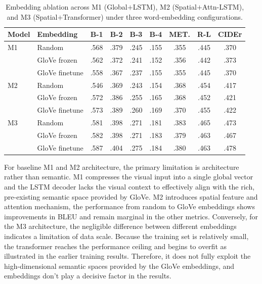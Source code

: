 \documentclass[10pt,twocolumn,letterpaper]{article}
\begin{document}
\begin{table}[H]
\begin{center}
\small
\setlength{\tabcolsep}{2pt}
\begin{tabular}{@{}llccccccc@{}}
\toprule
Model & Embedding & B-1 & B-2 & B-3 & B-4 & MET. & R-L & CIDEr \\
\midrule
M1 & Random         & .568 & .379 & .245 & .155 & .355 & .445 & .370 \\
   & GloVe frozen   & .562 & .372 & .241 & .152 & .356 & .442 & .373 \\
   & GloVe finetune & .558 & .367 & .237 & .155 & .355 & .445 & .370 \\
\midrule
M2 & Random         & .546 & .369 & .243 & .154 & .368 & .454 & .417 \\
   & GloVe frozen   & .572 & .386 & .255 & .165 & .368 & .452 & .421 \\
   & GloVe finetune & .573 & .389 & .260 & .169 & .370 & .455 & .422 \\
\midrule
M3 & Random         & .581 & .398 & .271 & .181 & .383 & .465 & .473 \\
   & GloVe frozen   & .582 & .398 & .271 & .183 & .379 & .463 & .467 \\
   & GloVe finetune & .587 & .404 & .275 & .184 & .380 & .463 & .478 \\
\bottomrule
\end{tabular}
\caption{\footnotesize Embedding ablation across M1 (Global$+$LSTM),
M2 (Spatial$+$Attn-LSTM), and M3 (Spatial$+$Transformer) under three
word-embedding configurations.}
\label{tab:emb}
\end{center}
\end{table}

For baseline M1 and M2 architecture, the primary limitation is
architecture rather than semantic. M1 compresses the visual input
into a single global vector and the LSTM decoder lacks the visual
context to effectively align with the rich, pre-existing semantic
space provided by GloVe. M2 introduces spatial feature and attention
mechanism, the performance from random to GloVe embeddings shows
improvements in BLEU and remain marginal in the other metrics.
Conversely, for the M3 architecture, the negligible difference
between different embeddings indicates a limitation of data scale.
Because the training set is relatively small, the transformer
reaches the performance ceiling and begins to overfit as illustrated
in the earlier training results. Therefore, it does not fully exploit
the high-dimensional semantic spaces provided by the GloVe
embeddings, and embeddings don't play a decisive factor in the
results.
\end{document}
